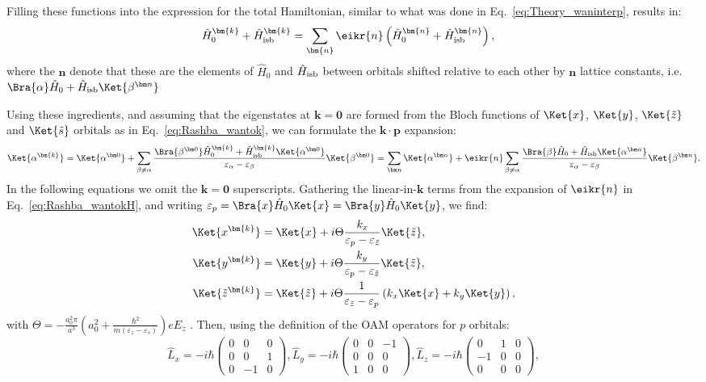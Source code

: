 Filling these functions into the expression for the total Hamiltonian, similar to what was done in Eq.~\eqref{eq:Theory_waninterp}, results in:
\begin{align}
	\label{eq:Rashba_wantokH}
	\hat{H}_0^{\bm{k}} + \hat{H}_{\rm isb}^{\bm{k}} &= \sum_{\bm{n}} \eikr{n} \left(\hat{H}_0^{\bm{n}} + \hat{H}_{\rm isb}^{\bm{n}}\right),
\end{align}
where the $\bm n$ denote that these are the elements of $\hat{H}_0$ and $\hat{H}_{\rm isb}$ between orbitals shifted relative to each other by $\bm n$ lattice constants, i.e. $\Bra{\alpha} \hat H_0 + \hat H_{\rm isb} \Ket{\beta^{\bm n}}$
    
Using these ingredients, and assuming that the eigenstates at $\bm k = \bm 0$ are formed from the Bloch functions of $\Ket{x}$, $\Ket{y}$, $\Ket{\tilde{z}}$ and $\Ket{\tilde{s}}$ orbitals as in Eq.~\eqref{eq:Rashba_wantok}, we can formulate the $\bm k \cdot \bm p$ expansion:
\begin{equation}
	\label{eq:Rashba_kdotp}
	\Ket{\alpha^{\bm{k}}}=\Ket{\alpha^{\bm 0}} + \sum_{\beta \neq \alpha} \frac{\Bra{\beta^{\bm 0}} \hat{H}_0^{\bm{k}} + \hat{H}_{\rm isb}^{\bm{k}} \Ket{\alpha^{\bm 0}}}{\varepsilon_{\alpha} - \varepsilon_{\beta}} \Ket{\beta^{\bm 0}} = \sum_{\bm n} \Ket{\alpha^{\bm n}} + \eikr{n} \sum_{\beta \neq \alpha} \frac{\Bra{\beta} \hat{H}_0 + \hat{H}_{\rm isb} \Ket{\alpha^{\bm n}}}{\varepsilon_{\alpha} - \varepsilon_{\beta}} \Ket{\beta^{\bm n}}.
\end{equation}
In the following equations we omit the $\bm{k}=\bm 0$ superscripts.
Gathering the linear-in-$\bm k$ terms from the expansion of $\eikr{n}$ in Eq.~\eqref{eq:Rashba_wantokH}, and writing $\varepsilon_p = \Bra{x} \hat{H}_0 \Ket{x} = \Bra{y} \hat{H}_0 \Ket{y}$, we find:
\begin{align}
	\Ket{x^{\bm{k}}} &= \Ket{x} + i \Theta \frac{k_x}{\varepsilon_p - \varepsilon_{\tilde{z}}}\Ket{\tilde{z}}, \\
	\Ket{y^{\bm{k}}} &= \Ket{y} + i \Theta \frac{k_y}{\varepsilon_p - \varepsilon_{\tilde{z}}}\Ket{\tilde{z}},\\
	\Ket{\tilde{z}^{\bm{k}}} &= \Ket{\tilde{z}} + i \Theta \frac{1}{\varepsilon_{\tilde{z}} - \varepsilon_p} \left(k_x\Ket{x} + k_y\Ket{y}\right),
\end{align}
with $\Theta = -\frac{a_0^2 \pi}{a^3}\left(a_0^2 + \frac{\hbar^2}{m(\varepsilon_z - \varepsilon_s)}\right) e E_z$ .
Then, using the definition of the OAM operators for $p$ orbitals:
\begin{equation}
	\hat{L}_x =-i\hbar\left(\begin{matrix}0&0&0\\0&0&1\\0&-1&0\end{matrix}\right), \hat{L}_y = -i\hbar \left(\begin{matrix}0&0&-1\\0&0&0\\1&0&0\end{matrix}\right), \hat{L}_z =-i\hbar\left(\begin{matrix}0&1&0\\-1&0&0\\0&0&0\end{matrix}\right),
\end{equation}
